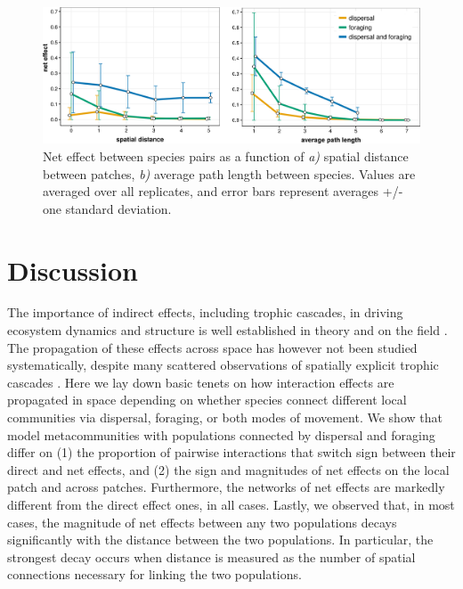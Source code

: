 \begin{figure}[ht]
\centering
\includegraphics[width=.9\textwidth,height=\textheight,keepaspectratio]{./Figures/chapter05/Fig_4.png}
\caption[Spatial decay of interaction effects]{\color{Gray}Net effect between species pairs as a function of \textit{a)} spatial distance between patches, \textit{b)} average path length between species. Values are averaged over all replicates, and error bars represent averages +/- one standard deviation.}\label{fig:fig5.4}
\end{figure}

\FloatBarrier

\section{Discussion}

The importance of indirect effects, including trophic cascades, in driving ecosystem dynamics and structure is well established in theory \citep{Abrams1992, Wootton2002, Gravel2010, Mayfield2017} and on the field \citep{Menge1995, Peacor1997, Moya-Larano2007, Barbosa2017, Trussell2017}. The propagation of these effects across space has however not been studied systematically, despite many scattered observations of spatially explicit trophic cascades \citep{Polis1997, Estes1998, Knight2005, Casini2012, Springer2018}. Here we lay down basic tenets on how interaction effects are propagated in space depending on whether species connect different local communities via dispersal, foraging, or both modes of movement. We show that model metacommunities with populations connected by dispersal and foraging differ on (1) the proportion of pairwise interactions that switch sign between their direct and net effects, and (2) the sign and magnitudes of net effects on the local patch and across patches. Furthermore, the networks of net effects are markedly different from the direct effect ones, in all cases. Lastly, we observed that, in most cases, the magnitude of net effects between any two populations decays significantly with the distance between the two populations. In particular, the strongest decay occurs when distance is measured as the number of spatial connections necessary for linking the two populations.

